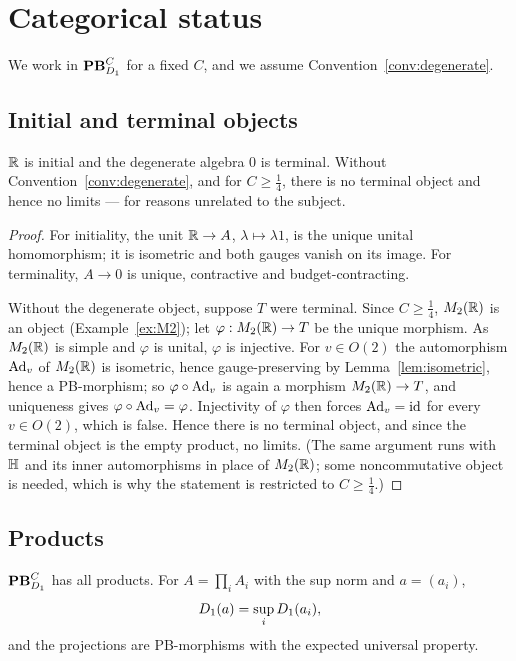 \section{Categorical status}
\label{sec:categorical}

We work in $\mathbf{PB}^C_{D_1}$ for a fixed $C$, and we assume
Convention~\ref{conv:degenerate}.

\subsection{Initial and terminal objects}

\begin{proposition}\label{prop:terminal}
$\mathbb{R}$ is initial and the degenerate algebra $0$ is terminal.  Without
Convention~\ref{conv:degenerate}, and for $C\ge\tfrac14$, there is no terminal
object and hence no limits --- for reasons unrelated to the subject.
\end{proposition}

\begin{proof}
For initiality, the unit $\mathbb{R}\to A$, $\lambda\mapsto\lambda1$, is the unique
unital homomorphism; it is isometric and both gauges vanish on its image.  For
terminality, $A\to0$ is unique, contractive and budget-contracting.

Without the degenerate object, suppose $T$ were terminal.  Since
$C\ge\tfrac14$, $M_2(\mathbb{R})$ is an object (Example~\ref{ex:M2}); let
$\varphi:M_2(\mathbb{R})\to T$ be the unique morphism.  As $M_2(\mathbb{R})$ is simple and
$\varphi$ is unital, $\varphi$ is injective.  For $v\in O(2)$ the automorphism
$\operatorname{Ad}_v$ of $M_2(\mathbb{R})$ is isometric, hence gauge-preserving by
Lemma~\ref{lem:isometric}, hence a PB-morphism; so $\varphi\circ\operatorname{Ad}_v$ is again
a morphism $M_2(\mathbb{R})\to T$, and uniqueness gives
$\varphi\circ\operatorname{Ad}_v=\varphi$.  Injectivity of $\varphi$ then forces
$\operatorname{Ad}_v=\operatorname{id}$ for every $v\in O(2)$, which is false.  Hence there is no terminal
object, and since the terminal object is the empty product, no limits.  (The
same argument runs with $\mathbb{H}$ and its inner automorphisms in place of
$M_2(\mathbb{R})$; some noncommutative object is needed, which is why the statement is
restricted to $C\ge\tfrac14$.)
\end{proof}

\subsection{Products}

\begin{proposition}\label{prop:products}
$\mathbf{PB}^C_{D_1}$ has all products.  For $A=\prod_iA_i$ with the sup norm and
$a=(a_i)$,
\[
  D_1(a)=\sup_iD_1(a_i),
\]
and the projections are PB-morphisms with the expected universal property.
\end{proposition}

